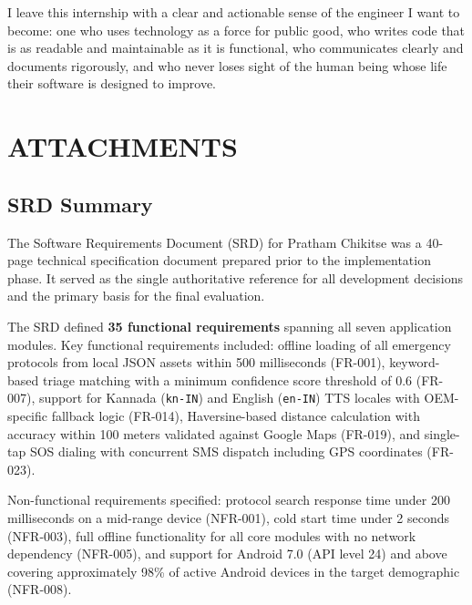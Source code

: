\documentclass[12pt,a4paper]{report}
\begin{document}
\vspace{0.4cm}

I leave this internship with a clear and actionable sense of the engineer I want to become: one who uses technology as a force for public good, who writes code that is as readable and maintainable as it is functional, who communicates clearly and documents rigorously, and who never loses sight of the human being whose life their software is designed to improve.

\newpage

\chapter{ATTACHMENTS}

\section{SRD Summary}

The Software Requirements Document (SRD) for Pratham Chikitse was a 40-page technical specification document prepared prior to the implementation phase. It served as the single authoritative reference for all development decisions and the primary basis for the final evaluation.

\vspace{0.4cm}

The SRD defined \textbf{35 functional requirements} spanning all seven application modules. Key functional requirements included: offline loading of all emergency protocols from local JSON assets within 500 milliseconds (FR-001), keyword-based triage matching with a minimum confidence score threshold of 0.6 (FR-007), support for Kannada (\texttt{kn-IN}) and English (\texttt{en-IN}) TTS locales with OEM-specific fallback logic (FR-014), Haversine-based distance calculation with accuracy within 100 meters validated against Google Maps (FR-019), and single-tap SOS dialing with concurrent SMS dispatch including GPS coordinates (FR-023).

\vspace{0.4cm}

Non-functional requirements specified: protocol search response time under 200 milliseconds on a mid-range device (NFR-001), cold start time under 2 seconds (NFR-003), full offline functionality for all core modules with no network dependency (NFR-005), and support for Android 7.0 (API level 24) and above covering approximately 98\% of active Android devices in the target demographic (NFR-008).
\end{document}
